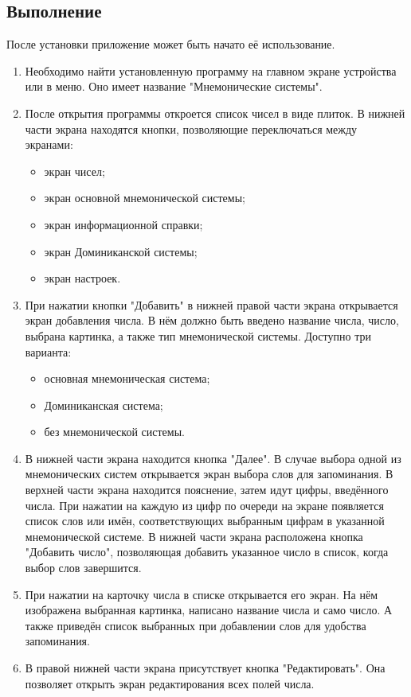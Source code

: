\documentclass[draft]{article}
\begin{document}
\subsection{Выполнение}
После установки приложение может быть начато её использование. 
\begin{enumerate}
\item Необходимо найти установленную программу на главном экране устройства или в меню. Оно имеет название "Мнемонические системы".
\item После открытия программы откроется список чисел в виде плиток. В нижней части экрана находятся кнопки, позволяющие переключаться между экранами:
\begin{itemize}
\item экран чисел;
\item экран основной мнемонической системы;
\item экран информационной справки;
\item экран Доминиканской системы;
\item экран настроек.
\end{itemize}
\item При нажатии кнопки "{}Добавить"{} в нижней правой части экрана открывается экран добавления числа. В нём должно быть введено название числа, число, выбрана картинка, а также тип мнемонической системы. Доступно три варианта:
\begin{itemize}
\item основная мнемоническая система;
\item Доминиканская система;
\item без мнемонической системы.
\end{itemize}
\item В нижней части экрана находится кнопка "{}Далее"{}. В случае выбора одной из мнемонических систем открывается экран выбора слов для запоминания. В верхней части экрана находится пояснение, затем идут цифры, введённого числа. При нажатии на каждую из цифр по очереди на экране появляется список слов или имён, соответствующих выбранным цифрам в указанной мнемонической системе. В нижней части экрана расположена кнопка "{}Добавить число"{}, позволяющая добавить указанное число в список, когда выбор слов завершится.
\item При нажатии на карточку числа в списке открывается его экран. На нём изображена выбранная картинка, написано название числа и само число. А также приведён список выбранных при добавлении слов для удобства запоминания.
\item В правой нижней части экрана присутствует кнопка "{}Редактировать"{}. Она позволяет открыть экран редактирования всех полей числа.
\end{enumerate}
\newpage
\end{document}

